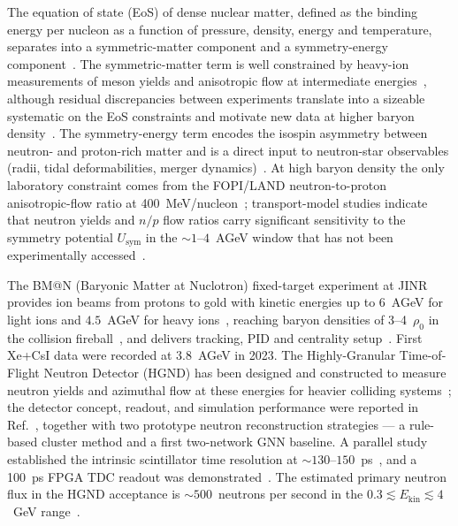 \documentclass[aps,prc,twocolumn,superscriptaddress,showpacs,%
               nofootinbib,floatfix,longbibliography]{revtex4-2}
\makeatletter
\newcommand{\Ekin}{E_{\text{kin}}}
\newcommand{\Usym}{U_{\text{sym}}}
\newcommand{\HGND}{HGND}
\newcommand{\BMN}{BM@N}
\makeatother
\begin{document}
The equation of state (EoS) of dense nuclear matter, defined as the
binding energy per nucleon as a function of pressure, density, energy
and temperature, separates into a symmetric-matter component and a
symmetry-energy component~\cite{Burgio2020NuclearMatter}.  The
symmetric-matter term is well constrained by heavy-ion measurements of
meson yields and anisotropic flow at intermediate
energies~\cite{E895_ellipticFlow, E895_sideFlow, E895_diffElliptic,
Sorensen2024EoS}, although residual discrepancies between experiments
translate into a sizeable systematic on the EoS constraints and
motivate new data at higher baryon density~\cite{Sorensen2024EoS,
LeFevre2015}.  The symmetry-energy term encodes the isospin
asymmetry between neutron- and proton-rich matter and is a direct
input to neutron-star observables (radii, tidal deformabilities,
merger dynamics)~\cite{Burgio2020NuclearMatter}.  At high baryon
density the only laboratory constraint comes from the FOPI/LAND
neutron-to-proton anisotropic-flow ratio at
400~MeV/nucleon~\cite{FOPI_LAND1, FOPI_LAND2}; transport-model
studies indicate that neutron yields and $n/p$ flow ratios carry
significant sensitivity to the symmetry potential $\Usym$ in the
$\sim 1$–$4$~AGeV window that has not been experimentally
accessed~\cite{Sorensen2024EoS, Burgio2020NuclearMatter}.

The \BMN{} (Baryonic Matter at Nuclotron) fixed-target experiment at
JINR provides ion beams from protons to gold with kinetic energies up
to $6$~AGeV for light ions and $4.5$~AGeV for heavy
ions~\cite{BMN_EPJ, Afanasiev2024BMN}, reaching baryon densities of
3–4~$\rho_0$ in the collision fireball~\cite{Cleymans, Friman}, and
delivers tracking, PID and centrality
setup~\cite{Afanasiev2024BMN, Senger2022BMN}.  First Xe+CsI data were
recorded at $3.8$~AGeV in 2023.  The Highly-Granular Time-of-Flight
Neutron Detector (\HGND{}) has been designed and constructed to
measure neutron yields and azimuthal flow at these energies for
heavier colliding systems~\cite{Morozov2024HGND, Guber2023HGND};
the detector concept, readout, and simulation performance were
reported in Ref.~\cite{Morozov2024HGND}, together with two prototype
neutron reconstruction strategies --- a rule-based cluster method and
a first two-network GNN baseline.  A parallel study established the
intrinsic scintillator time resolution at
$\sim 130$–$150$~ps~\cite{Guber2023SiPM}, and a 100~ps FPGA TDC
readout was demonstrated~\cite{Finogeev2024TDC}.  The estimated
primary neutron flux in the \HGND{} acceptance is
$\sim 500$~neutrons per second in the
$0.3 \lesssim \Ekin \lesssim 4$~GeV range~\cite{Morozov2024HGND}.
\end{document}
